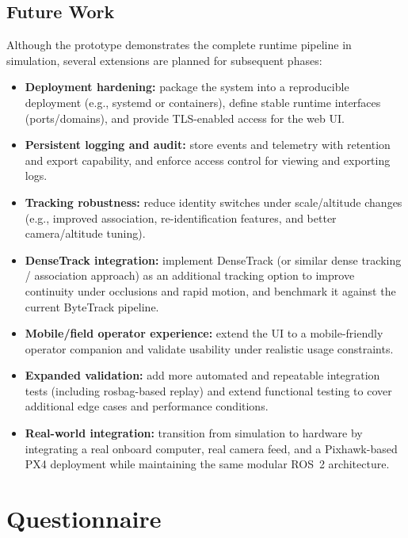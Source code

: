 \documentclass[12pt,a4paper]{report}
\begin{document}
\section{Future Work}
Although the prototype demonstrates the complete runtime pipeline in simulation, several extensions are planned for subsequent phases:
\begin{itemize}
    \item \textbf{Deployment hardening:} package the system into a reproducible deployment (e.g., systemd or containers), define stable runtime interfaces (ports/domains), and provide TLS-enabled access for the web UI.
    \item \textbf{Persistent logging and audit:} store events and telemetry with retention and export capability, and enforce access control for viewing and exporting logs.
    \item \textbf{Tracking robustness:} reduce identity switches under scale/altitude changes (e.g., improved association, re-identification features, and better camera/altitude tuning).
    \item \textbf{DenseTrack integration:} implement DenseTrack (or similar dense tracking / association approach) as an additional tracking option to improve continuity under occlusions and rapid motion, and benchmark it against the current ByteTrack pipeline.
    \item \textbf{Mobile/field operator experience:} extend the UI to a mobile-friendly operator companion and validate usability under realistic usage constraints.
    \item \textbf{Expanded validation:} add more automated and repeatable integration tests (including rosbag-based replay) and extend functional testing to cover additional edge cases and performance conditions.
    \item \textbf{Real-world integration:} transition from simulation to hardware by integrating a real onboard computer, real camera feed, and a Pixhawk-based \ac{PX4} deployment while maintaining the same modular ROS~2 architecture.
\end{itemize}





\cleardoublepage
{}
 



\appendix
\chapter{Questionnaire}
\label{app:questionnaire}
\end{document}
